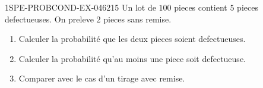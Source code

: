 \begin{exercice}{1SPE-PROBCOND-EX-046}{2}{15}
Un lot de $100$ pieces contient $5$ pieces defectueuses. On preleve $2$ pieces sans remise.

\begin{enumerate}
  \item Calculer la probabilité que les deux pieces soient defectueuses.
  \item Calculer la probabilité qu'au moins une piece soit defectueuse.
  \item Comparer avec le cas d'un tirage avec remise.
\end{enumerate}
\end{exercice}
